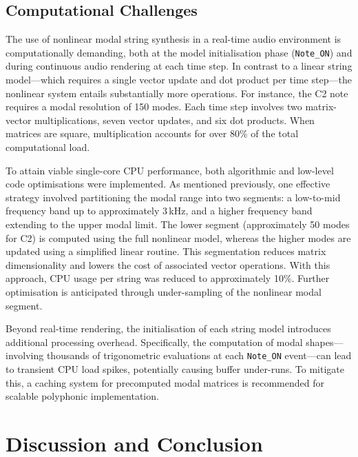 \subsection{Computational Challenges}

The use of nonlinear modal string synthesis in a real-time audio environment is computationally demanding, both at the model initialisation phase (\texttt{Note\_ON}) and during continuous audio rendering at each time step. In contrast to a linear string model—which requires a single vector update and dot product per time step—the nonlinear system entails substantially more operations. For instance, the C2 note requires a modal resolution of 150 modes. Each time step involves two matrix-vector multiplications, seven vector updates, and six dot products. When matrices are square, multiplication accounts for over 80\% of the total computational load.

To attain viable single-core CPU performance, both algorithmic and low-level code optimisations were implemented. As mentioned previously, one effective strategy involved partitioning the modal range into two segments: a low-to-mid frequency band up to approximately 3\,kHz, and a higher frequency band extending to the upper modal limit. The lower segment (approximately 50 modes for C2) is computed using the full nonlinear model, whereas the higher modes are updated using a simplified linear routine. This segmentation reduces matrix dimensionality and lowers the cost of associated vector operations. With this approach, CPU usage per string was reduced to approximately 10\%. Further optimisation is anticipated through under-sampling of the nonlinear modal segment.

Beyond real-time rendering, the initialisation of each string model introduces additional processing overhead. Specifically, the computation of modal shapes—involving thousands of trigonometric evaluations at each \texttt{Note\_ON} event—can lead to transient CPU load spikes, potentially causing buffer under-runs. To mitigate this, a caching system for precomputed modal matrices is recommended for scalable polyphonic implementation.





\section{Discussion and Conclusion}

